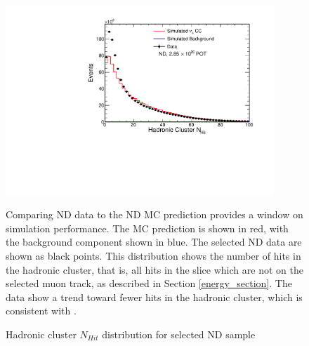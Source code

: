 \begin{figure}
\begin{center}
\includegraphics[width=0.9\textwidth]{figures/selection_nd/hadNHit_NumuContainND_CVN.pdf}
\end{center}
\caption{Hadronic cluster $N_{Hit}$ distribution for selected ND sample}{
Comparing ND data to the ND MC prediction provides a window on simulation
performance.  The MC prediction is shown in red, with the background
component shown in blue.
The selected ND data are shown as black points.
This distribution shows the number of hits in the hadronic cluster, that is,
all hits in the slice which are not on the selected muon track,
as described in Section \ref{energy_section}.
The data show a trend toward fewer hits in the hadronic cluster, which is
consistent with \cite{nova2016numu}.}
\label{nd_selected_hadNHit}
\end{figure}

